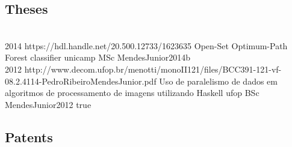 

\subsection*{Theses}

\begin{publications}
  \\

  {2014}
  {https://hdl.handle.net/20.500.12733/1623635}
  {Open-Set Optimum-Path Forest classifier}
  {unicamp}
  {MSc}
  {MendesJunior2014b}
  {}
  \\

  {2012}
  {http://www.decom.ufop.br/menotti/monoII121/files/BCC391-121-vf-08.2.4114-PedroRibeiroMendesJunior.pdf}
  {Uso de paralelismo de dados em algoritmos de processamento de imagens utilizando Haskell}
  {ufop}
  {BSc}
  {MendesJunior2012}
  {true}
  \\

\end{publications}

\subsection*{Patents}

